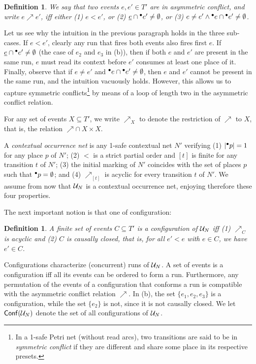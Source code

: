 \documentclass[11pt,a4paper]{article}
\newtheorem{definition}[theorem]{Definition}
\newcommand{\conf}[1]{\ensuremath{\mathsf{Conf}(#1)}}
\begin{document}
\begin{definition}
\label{def:asymmetric.conflict}
We say that two events $e, e' \in T'$ are in \emph{asymmetric conflict}, and
write $e \nearrow e'$, iff either (1) $e < e'$, or (2) $\underline{e} \cap {}^\bullet e'
\not= \emptyset$, or (3) $e \not= e' \land {}^\bullet e \cap {}^\bullet e' \not=
\emptyset$.
\end{definition}

Let us see why the intuition in the previous paragraph holds in the three
sub-cases.  If $e < e'$, clearly any run that fires both events also fires
first $e$.  If $\underline{e} \cap {}^\bullet e' \not = \emptyset$ (the case of $e_2$ and
$e_3$ in  (b)), then if both $e$ and $e'$ are present in the same
run, $e$ must read its context before $e'$ consumes at least one place of it.
Finally, observe that if $e \not = e'$ and ${}^\bullet e \cap {}^\bullet e' \not =
\emptyset$, then $e$ and $e'$ cannot be present in the same run, and the
intuition vacuously holds.  However, this allows us to capture symmetric
conflicts\footnote{In a 1-safe Petri net (without read arcs), two transitions
are said to be in \emph{symmetric conflict} if they are different and share
some place in its respective presets.} by means of a loop of length two in the
asymmetric conflict relation.

For any set of events $X \subseteq T'$, we write $\nearrow_X$ to denote the
restriction of $\nearrow$ to $X$, that is, the relation $\nearrow \cap \ X
\times X$.

A \emph{contextual occurrence net} is any 1-safe contextual net $N'$ verifying
(1) $|{}^\bullet p| = 1$ for any place $p$ of $N'$; (2) $<$ is a strict partial order
and $[t]$ is finite for any transition $t$ of $N'$; (3) the initial marking of
$N'$ coincides with the set of places $p$ such that ${}^\bullet p = \emptyset$; and
(4) $\nearrow_{[t]}$ is acyclic for every transition $t$ of $N'$.  We assume
from now that $\mathcal{U}_{N}$ is a contextual occurrence net, enjoying therefore these
four properties.

The next important notion is that one of configuration:

\begin{definition}
A finite set of events $C \subseteq T'$ is a \emph{configuration} of $\mathcal{U}_{N}$
iff (1) $\nearrow_C$ is acyclic and (2) $C$ is causally closed, that is, for
all $e' < e$ with $e \in C$, we have $e' \in C$.
\end{definition}

Configurations characterize (concurrent) runs of $\mathcal{U}_{N}$.  A set of events is
a configuration iff all its events can be ordered to form a run.  Furthermore,
any permutation of the events of a configuration that conforms a run is
compatible with the asymmetric conflict relation $\nearrow$.  In 
(b), the set $\{e_1, e_2, e_3\}$ is a configuration, while the set $\{e_2\}$ is
not, since it is not causally closed.  We let $\conf{\unf N}$ denote the set of
all configurations of $\mathcal{U}_{N}$.
\end{document}
